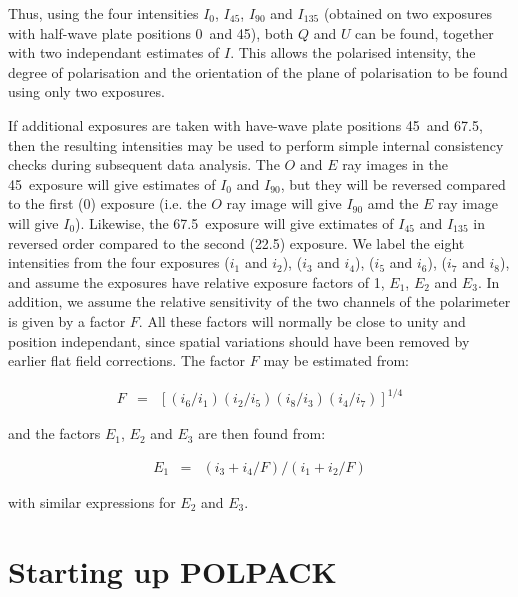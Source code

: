 Thus, using the four intensities $I_{0}$, $I_{45}$, $I_{90}$ and $I_{135}$
(obtained on two exposures with half-wave plate positions 0\dgs\ and
45\dgs), both $Q$ and $U$ can be found, together with two
independant estimates of $I$. This allows the polarised intensity, the
degree of polarisation and the orientation of the plane of polarisation to
be found using only two exposures. 

If additional exposures are taken with have-wave plate positions 45\dgs\
and 67.5\dgs, then the resulting intensities may be used to perform
simple internal consistency checks during subsequent data analysis. The
$O$ and $E$ ray images in the 45\dgs\ exposure will give estimates of
$I_{0}$ and $I_{90}$, but they will be reversed compared to the first
(0\dgs) exposure (i.e. the $O$ ray image will give $I_{90}$ amd the $E$
ray image will give $I_{0}$). Likewise, the 67.5\dgs\ exposure will give
extimates of $I_{45}$ and $I_{135}$ in reversed order compared to the
second (22.5\dgs) exposure. We label the eight intensities from the four
exposures ($i_{1}$ and $i_{2}$), ($i_{3}$ and $i_{4}$), ($i_{5}$ and
$i_{6}$), ($i_{7}$ and $i_{8}$), and assume the exposures have relative
exposure factors of 1, $E_{1}$, $E_{2}$ and $E_{3}$. In addition, we
assume the relative sensitivity of the two channels of the polarimeter is
given by a factor $F$. All these factors will normally be close to unity
and position independant, since spatial variations should have been
removed by earlier flat field corrections. The factor $F$ may be
estimated from:

\begin{eqnarray*}
  F & = & [(i_{6}/i_{1})(i_{2}/i_{5})(i_{8}/i_{3})(i_{4}/i_{7})]^{1/4}
\end{eqnarray*}

and the factors $E_{1}$, $E_{2}$ and $E_{3}$ are then found from:

\begin{eqnarray*}
  E_{1} & = & (i_{3}+i_{4}/F)/(i_{1}+i_{2}/F)
\end{eqnarray*}

with similar expressions for $E_{2}$ and $E_{3}$.







\section{Starting up POLPACK}

